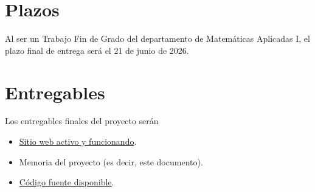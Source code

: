 \section{Plazos}

Al ser un Trabajo Fin de Grado del departamento de Matemáticas Aplicadas I, el plazo final de entrega será el 21 de junio de 2026.

\section{Entregables}

Los entregables finales del proyecto serán

\begin{itemize}
    \item \href{https://introduction-to-sike.vercel.app}{Sitio web activo y funcionando}.
    \item Memoria del proyecto (es decir, este documento).
    \item \href{https://github.com/albramvar1/introduction-to-sike}{Código fuente disponible}.
\end{itemize}